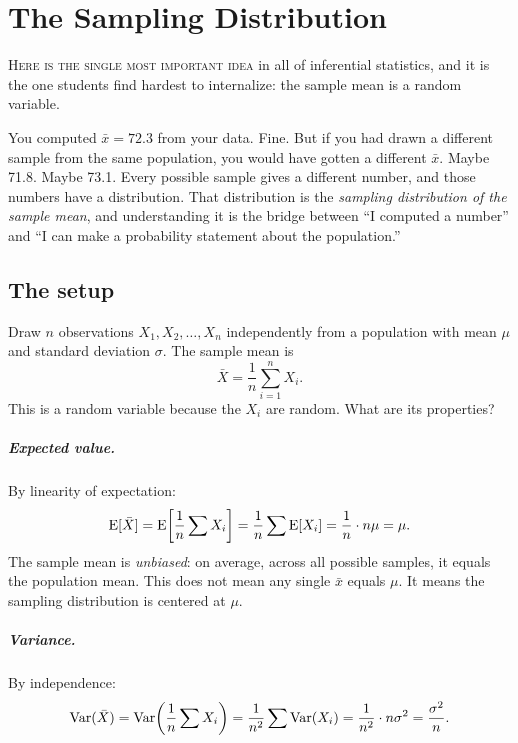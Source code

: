 \chapter{The Sampling Distribution}
\label{ch:sampling}

\noindent\textsc{Here is the single most important idea} in all of inferential statistics, and it is the one students find hardest to internalize: the sample mean is a random variable.

You computed $\bar{x} = 72.3$ from your data. Fine. But if you had drawn a different sample from the same population, you would have gotten a different $\bar{x}$. Maybe 71.8. Maybe 73.1. Every possible sample gives a different number, and those numbers have a distribution. That distribution is the \emph{sampling distribution of the sample mean}, and understanding it is the bridge between ``I computed a number'' and ``I can make a probability statement about the population.''

\section{The setup}

Draw $n$ observations $X_1, X_2, \ldots, X_n$ independently from a population with mean $\mu$ and standard deviation $\sigma$. The sample mean is
\[
  \bar{X} = \frac{1}{n}\sum_{i=1}^{n} X_i.
\]
This is a random variable because the $X_i$ are random. What are its properties?

\paragraph{Expected value.} By linearity of expectation:
\begin{equation}
  \operatorname{E}[\bar{X}] = \operatorname{E}\!\left[\frac{1}{n}\sum X_i\right] = \frac{1}{n}\sum \operatorname{E}[X_i] = \frac{1}{n} \cdot n\mu = \mu.
  \label{eq:mean-of-xbar}
\end{equation}
The sample mean is \emph{unbiased}: on average, across all possible samples, it equals the population mean. This does not mean any single $\bar{x}$ equals $\mu$. It means the sampling distribution is centered at $\mu$.

\paragraph{Variance.} By independence:
\begin{equation}
  \operatorname{Var}(\bar{X}) = \operatorname{Var}\!\left(\frac{1}{n}\sum X_i\right) = \frac{1}{n^2}\sum \operatorname{Var}(X_i) = \frac{1}{n^2} \cdot n\sigma^2 = \frac{\sigma^2}{n}.
  \label{eq:var-of-xbar}
\end{equation}

